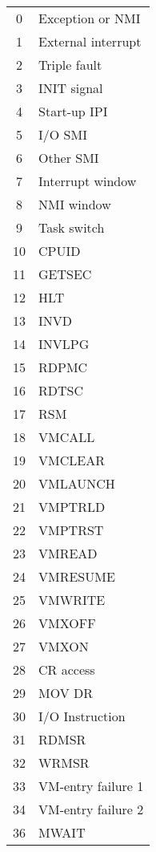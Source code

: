 \documentclass{report}
\begin{document}
\begin{spacing}{1.5}
\begin{longtable}{|c|l|}
\large{0}  & \large{Exception or NMI} \\
\large{1}  & \large{External interrupt} \\
\large{2}  & \large{Triple fault} \\
\large{3}  & \large{INIT signal} \\
\large{4}  & \large{Start-up IPI} \\
\large{5}  & \large{I/O SMI} \\
\large{6}  & \large{Other SMI} \\
\large{7}  & \large{Interrupt window} \\
\large{8}  & \large{NMI window} \\
\large{9}  & \large{Task switch} \\
\large{10} & \large{CPUID} \\
\large{11} & \large{GETSEC} \\
\large{12} & \large{HLT} \\
\large{13} & \large{INVD} \\
\large{14} & \large{INVLPG} \\
\large{15} & \large{RDPMC} \\
\large{16} & \large{RDTSC} \\
\large{17} & \large{RSM} \\
\large{18} & \large{VMCALL} \\
\large{19} & \large{VMCLEAR} \\
\large{20} & \large{VMLAUNCH} \\
\large{21} & \large{VMPTRLD} \\
\large{22} & \large{VMPTRST} \\
\large{23} & \large{VMREAD} \\
\large{24} & \large{VMRESUME} \\
\large{25} & \large{VMWRITE} \\
\large{26} & \large{VMXOFF} \\
\large{27} & \large{VMXON} \\
\large{28} & \large{CR access} \\
\large{29} & \large{MOV DR} \\
\large{30} & \large{I/O Instruction} \\
\large{31} & \large{RDMSR} \\
\large{32} & \large{WRMSR} \\
\large{33} & \large{VM-entry failure 1} \\
\large{34} & \large{VM-entry failure 2} \\
\large{36} & \large{MWAIT} \\

\end{longtable}
\end{spacing}
\end{document}
